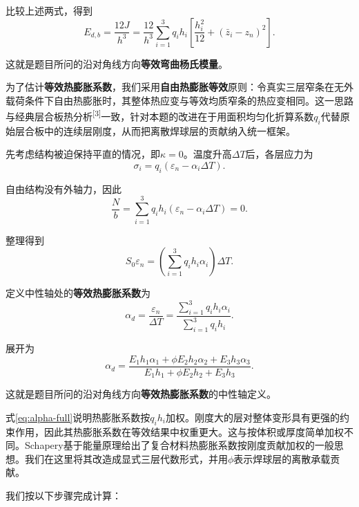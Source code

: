 \documentclass[draft,12pt,a4paper]{ctexart}
\theoremstyle{definition}
\begin{document}
比较上述两式，得到
\begin{equation}\label{eq:Edb}
E_{d,b}=\frac{12J}{h^3}
=\frac{12}{h^3}\sum_{i=1}^{3}q_i h_i
\left[\frac{h_i^2}{12}+(\bar{z}_i-z_n)^2\right].
\end{equation}

这就是题目所问的沿对角线方向\textbf{等效弯曲杨氏模量}。


为了估计\textbf{等效热膨胀系数}，我们采用\textbf{自由热膨胀等效}原则：令真实三层窄条在无外载荷条件下自由热膨胀时，其整体热应变与等效均质窄条的热应变相同。这一思路与经典层合板热分析\textsuperscript{[3]}一致，针对本题的改进在于用面积均匀化折算系数$q_i$代替原始层合板中的连续层刚度，从而把离散焊球层的贡献纳入统一框架。

先考虑结构被迫保持平直的情况，即$\kappa=0$。温度升高$\Delta T$后，各层应力为
\begin{equation}
\sigma_i=q_i(\varepsilon_n-\alpha_i\Delta T).
\end{equation}

自由结构没有外轴力，因此
\begin{equation}
\frac{N}{b}=\sum_{i=1}^{3}q_i h_i(\varepsilon_n-\alpha_i\Delta T)=0.
\end{equation}

整理得到
\begin{equation}
S_0\varepsilon_n=
\left(\sum_{i=1}^{3}q_i h_i\alpha_i\right)\Delta T.
\end{equation}

定义中性轴处的\textbf{等效热膨胀系数}为
\begin{equation}\label{eq:alpha}
\alpha_d=\frac{\varepsilon_n}{\Delta T}
=\frac{\sum_{i=1}^{3}q_i h_i\alpha_i}{\sum_{i=1}^{3}q_i h_i}.
\end{equation}

展开为
\begin{equation}\label{eq:alpha-full}
\alpha_d=
\frac{E_1 h_1\alpha_1+\phi E_2 h_2\alpha_2+E_3 h_3\alpha_3}
{E_1 h_1+\phi E_2 h_2+E_3 h_3}.
\end{equation}

这就是题目所问的沿对角线方向\textbf{等效热膨胀系数}的中性轴定义。

式\eqref{eq:alpha-full}说明热膨胀系数按$q_i h_i$加权。刚度大的层对整体变形具有更强的约束作用，因此其热膨胀系数在等效结果中权重更大。这与按体积或厚度简单加权不同。Schapery基于能量原理给出了复合材料热膨胀系数按刚度贡献加权的一般思想。我们在这里将其改造成显式三层代数形式，并用$\phi$表示焊球层的离散承载贡献。


我们按以下步骤完成计算：
\end{document}
